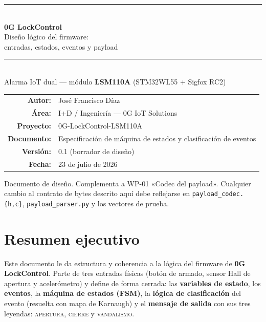 \documentclass[11pt,a4paper]{article}
\renewcommand{\today}{23 de julio de 2026}
\begin{document}
\begin{titlepage}
\centering
\vspace*{1.5cm}
{\color{Indigo0G}\rule{\linewidth}{2pt}}\\[0.4cm]
{\Huge\bfseries\color{Indigo0G} 0G LockControl}\\[0.3cm]
{\LARGE\color{Purple0G} Diseño lógico del firmware:\\[0.2em] entradas, estados, eventos y payload}\\[0.4cm]
{\color{Gold0G}\rule{\linewidth}{2pt}}\\[1.2cm]

{\large Alarma IoT dual — módulo \textbf{LSM110A} (STM32WL55 + Sigfox RC2)}\\[2cm]

\begin{tabular}{rl}
\textbf{\color{Indigo0G}Autor:} & José Francisco Díaz \\[0.3em]
\textbf{\color{Indigo0G}Área:} & I+D / Ingeniería — 0G IoT Solutions \\[0.3em]
\textbf{\color{Indigo0G}Proyecto:} & 0G-LockControl-LSM110A \\[0.3em]
\textbf{\color{Indigo0G}Documento:} & Especificación de máquina de estados y clasificación de eventos \\[0.3em]
\textbf{\color{Indigo0G}Versión:} & 0.1 (borrador de diseño) \\[0.3em]
\textbf{\color{Indigo0G}Fecha:} & \today \\
\end{tabular}

\vfill
{\small\color{Gray0G} Documento de diseño. Complementa a WP-01 «Codec del payload».
Cualquier cambio al contrato de bytes descrito aquí debe reflejarse en
\texttt{payload\_codec.\{h,c\}}, \texttt{payload\_parser.py} y los vectores de prueba.}
\end{titlepage}

\tableofcontents
\newpage

\section{Resumen ejecutivo}

Este documento le da estructura y coherencia a la lógica del firmware de
\textbf{0G LockControl}. Parte de tres entradas físicas (botón de armado, sensor
Hall de apertura y acelerómetro) y define de forma cerrada: las \textbf{variables
de estado}, los \textbf{eventos}, la \textbf{máquina de estados (FSM)}, la
\textbf{lógica de clasificación} del evento (resuelta con mapa de Karnaugh) y el
\textbf{mensaje de salida} con sus tres leyendas: \textsc{apertura},
\textsc{cierre} y \textsc{vandalismo}.
\end{document}
